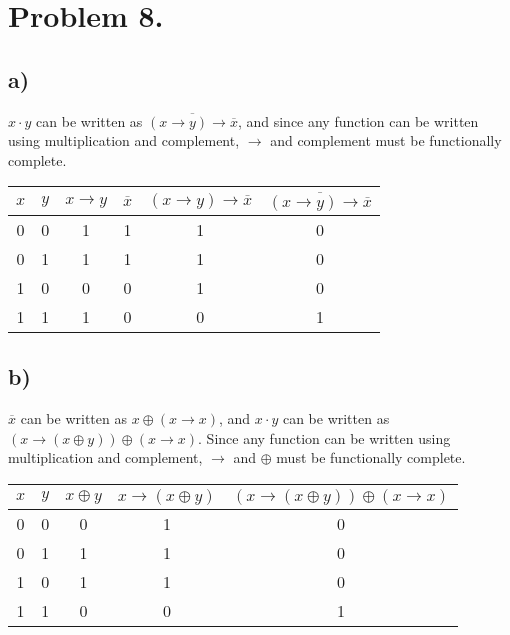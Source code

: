 \documentclass{article}
\begin{document}
\section*{Problem 8.}
\subsection*{a)}
$x\cdot y$ can be written as $\overline{(x\rightarrow y)\rightarrow\overline{x}}$, and since any function can be written using multiplication and complement, $\rightarrow$ and complement must be functionally complete.\\
\begin{tabular}{| c | c | c | c | c | c |}
    \hline
    $x$ & $y$ & $x\rightarrow y$ & $\overline{x}$ & $(x\rightarrow y)\rightarrow\overline{x}$ & $\overline{(x\rightarrow y)\rightarrow\overline{x}}$ \\ \hline \hline
    0 & 0 & 1 & 1 & 1 & 0 \\ \hline
    0 & 1 & 1 & 1 & 1 & 0 \\ \hline
    1 & 0 & 0 & 0 & 1 & 0 \\ \hline
    1 & 1 & 1 & 0 & 0 & 1 \\ \hline
\end{tabular}
\subsection*{b)}
$\overline{x}$ can be written as $x\oplus(x\rightarrow x)$, and $x\cdot y$ can be written as $(x\rightarrow (x\oplus y)) \oplus (x\rightarrow x)$. Since any function can be written using multiplication and complement, $\rightarrow$ and $\oplus$ must be functionally complete.\\
\begin{tabular}{| c | c | c | c | c |}
    \hline
    $x$ & $y$ & $x\oplus y$ & $x\rightarrow (x\oplus y)$ & $(x\rightarrow (x\oplus y)) \oplus (x\rightarrow x)$\\ \hline \hline
    0 & 0 & 0 & 1 & 0\\ \hline
    0 & 1 & 1 & 1 & 0\\ \hline
    1 & 0 & 1 & 1 & 0\\ \hline
    1 & 1 & 0 & 0 & 1\\ \hline
\end{tabular}
\end{document}
